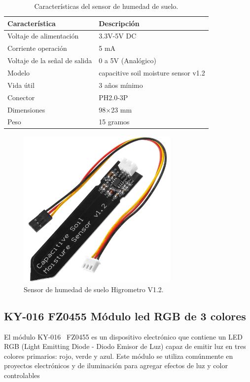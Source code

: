\begin{table}[htbp]
\begin{center}
\caption{Características del sensor de humedad de suelo.}
\begin{tabular}{|l|l|}
\hline
\rowcolor[HTML]{C0C0C0} 
\textbf{Característica} & \textbf{Descripción}\\ \hline
Voltaje de alimentación & 3.3V\quad-\quad5V DC \\ \hline
Corriente operación & 5 mA \\ \hline
Voltaje de la señal de salida & 0 a 5V (Analógico) \\ \hline
Modelo & capacitive soil moisture sensor v1.2 \\ \hline
Vida útil & 3 años mínimo \\ \hline
Conector & PH2.0-3P \\ \hline
Dimensiones & 98$\times$23 mm \\ \hline
Peso & 15 gramos \\ \hline
\end{tabular}
\end{center}
\end{table}

\begin{figure}[h]
    \centering
    \includegraphics[width=0.7\textwidth]{img/herramientas/SensorHumedadSuelo.png}
    \caption{Sensor de humedad de suelo Higrometro V1.2.}
\end{figure}

\subsection{KY-016 FZ0455 Módulo led RGB de 3 colores}
El módulo KY-016~\cite{manual:LedRGB} FZ0455 es un dispositivo electrónico que contiene un LED RGB (Light Emitting Diode - Diodo Emisor de Luz) capaz de emitir luz en tres colores primarios: rojo, verde y azul. Este módulo se utiliza comúnmente en proyectos electrónicos y de iluminación para agregar efectos de luz y color controlables

